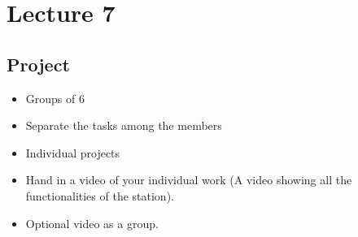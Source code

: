 \documentclass{article}
\begin{document}
\section*{Lecture 7}%
\label{sec:lecture_7}
\subsection*{Project}%
\label{sub:project}

\begin{itemize}
	\item Groups of 6
	\item Separate the tasks among the members
	\item Individual projects
	\item Hand in a video of your individual work (A video showing all the functionalities of the station).
	\item Optional video as a group.
\end{itemize}
\end{document}
